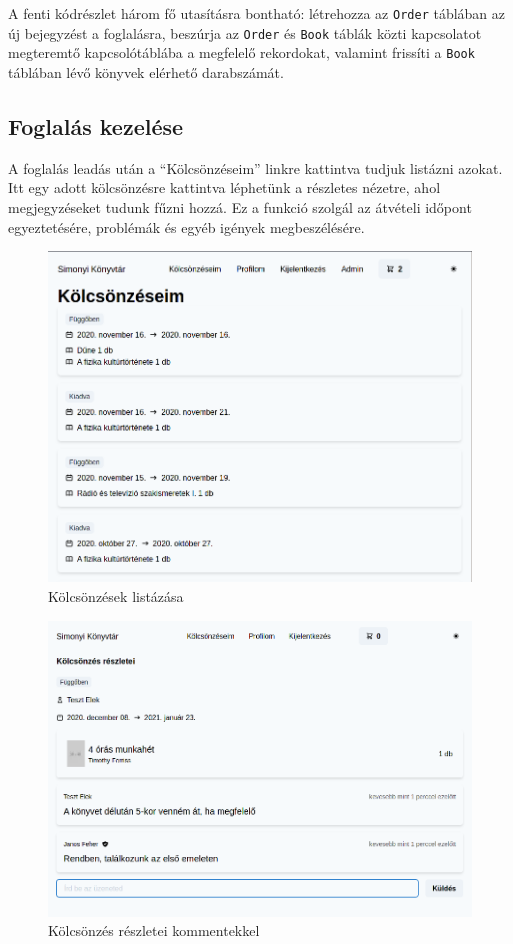 A fenti kódrészlet három fő utasításra bontható: létrehozza az \lstinline|Order| táblában az új bejegyzést a foglalásra,
beszúrja az \lstinline|Order| és \lstinline|Book| táblák közti kapcsolatot megteremtő kapcsolótáblába a megfelelő rekordokat,
valamint frissíti a \lstinline|Book| táblában lévő könyvek elérhető darabszámát.


\subsection{Foglalás kezelése}

A foglalás leadás után a ``Kölcsönzéseim'' linkre kattintva tudjuk listázni azokat. Itt egy adott kölcsönzésre kattintva
léphetünk a részletes nézetre, ahol megjegyzéseket tudunk fűzni hozzá. Ez a funkció szolgál az átvételi időpont egyeztetésére,
problémák és egyéb igények megbeszélésére.

\begin{figure}[!ht]
  \centering
  \includegraphics[width=150mm, keepaspectratio]{figures/orders-list.png}
  \caption{Kölcsönzések listázása}
  \label{fig:OrderList}
\end{figure}


\begin{figure}[!ht]
  \centering
  \includegraphics[width=150mm, keepaspectratio]{figures/order-detail.png}
  \caption{Kölcsönzés részletei kommentekkel}
  \label{fig:OrderDetail}
\end{figure}



